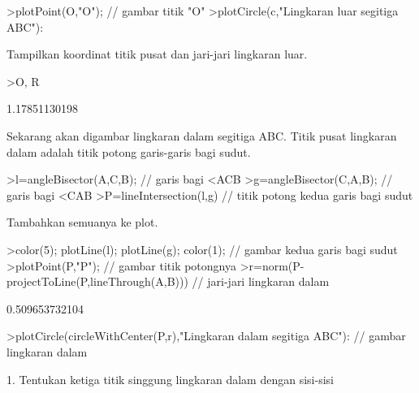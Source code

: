 \documentclass[12pt,arial,letterpaper]{book}
\begin{document}
\begin{eulercomment}
\begin{eulercomment}
\begin{eulercomment}
\begin{eulercomment}
\begin{eulercomment}
\begin{eulercomment}
\begin{eulercomment}
\begin{eulercomment}
\begin{eulercomment}
\begin{eulercomment}
\begin{eulercomment}
\begin{eulercomment}
\begin{eulercomment}
\begin{eulercomment}
\begin{eulercomment}
\begin{eulercomment}
\begin{eulercomment}
\begin{eulercomment}
\begin{eulercomment}
\begin{eulercomment}
\begin{eulercomment}
\begin{eulercomment}
\begin{eulercomment}
\begin{eulercomment}
\begin{eulerprompt}
>plotPoint(O,"O"); // gambar titik "O"
>plotCircle(c,"Lingkaran luar segitiga ABC"):
\end{eulerprompt}
\begin{eulercomment}
Tampilkan koordinat titik pusat dan jari-jari lingkaran luar.
\end{eulercomment}
\begin{eulerprompt}
>O, R
\end{eulerprompt}
\begin{euleroutput}
  [1.16667,  1.16667]
  1.17851130198
\end{euleroutput}
\begin{eulercomment}
Sekarang akan digambar lingkaran dalam segitiga ABC. Titik pusat lingkaran dalam adalah
titik potong garis-garis bagi sudut.
\end{eulercomment}
\begin{eulerprompt}
>l=angleBisector(A,C,B); // garis bagi <ACB
>g=angleBisector(C,A,B); // garis bagi <CAB
>P=lineIntersection(l,g) // titik potong kedua garis bagi sudut
\end{eulerprompt}
\begin{euleroutput}
  [0.86038,  0.86038]
\end{euleroutput}
\begin{eulercomment}
Tambahkan semuanya ke plot.
\end{eulercomment}
\begin{eulerprompt}
>color(5); plotLine(l); plotLine(g); color(1); // gambar kedua garis bagi sudut
>plotPoint(P,"P"); // gambar titik potongnya
>r=norm(P-projectToLine(P,lineThrough(A,B))) // jari-jari lingkaran dalam
\end{eulerprompt}
\begin{euleroutput}
  0.509653732104
\end{euleroutput}
\begin{eulerprompt}
>plotCircle(circleWithCenter(P,r),"Lingkaran dalam segitiga ABC"): // gambar lingkaran dalam
\end{eulerprompt}
\begin{eulercomment}
1. Tentukan ketiga titik singgung lingkaran dalam dengan sisi-sisi

\end{eulercomment}
\end{eulercomment}
\end{eulercomment}
\end{eulercomment}
\end{eulercomment}
\end{eulercomment}
\end{eulercomment}
\end{eulercomment}
\end{eulercomment}
\end{eulercomment}
\end{eulercomment}
\end{eulercomment}
\end{eulercomment}
\end{eulercomment}
\end{eulercomment}
\end{eulercomment}
\end{eulercomment}
\end{eulercomment}
\end{eulercomment}
\end{eulercomment}
\end{eulercomment}
\end{eulercomment}
\end{eulercomment}
\end{eulercomment}
\end{eulercomment}
\end{document}
